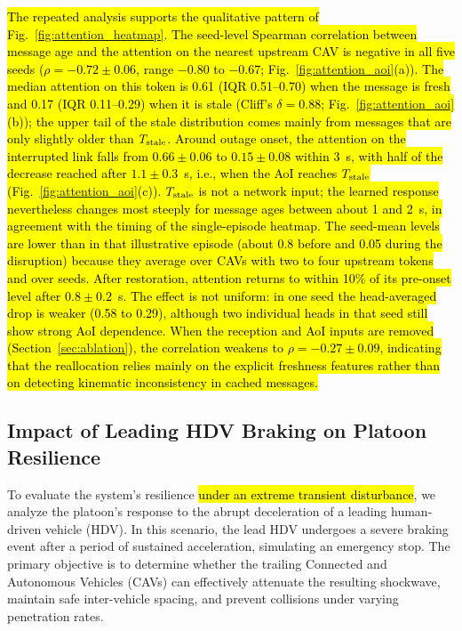 \documentclass{ieeeaccess}
\begin{document}
\hl{The repeated analysis supports the qualitative pattern of Fig.~\ref{fig:attention_heatmap}. The seed-level Spearman correlation between message age and the attention on the nearest upstream CAV is negative in all five seeds ($\rho=-0.72\pm0.06$, range $-0.80$ to $-0.67$; Fig.~\ref{fig:attention_aoi}(a)). The median attention on this token is 0.61 (IQR 0.51--0.70) when the message is fresh and 0.17 (IQR 0.11--0.29) when it is stale (Cliff's $\delta=0.88$; Fig.~\ref{fig:attention_aoi}(b)); the upper tail of the stale distribution comes mainly from messages that are only slightly older than $T_{\rm stale}$. Around outage onset, the attention on the interrupted link falls from $0.66\pm0.06$ to $0.15\pm0.08$ within 3~s, with half of the decrease reached after $1.1\pm0.3$~s, i.e., when the AoI reaches $T_{\rm stale}$ (Fig.~\ref{fig:attention_aoi}(c)). $T_{\rm stale}$ is not a network input; the learned response nevertheless changes most steeply for message ages between about 1 and 2~s, in agreement with the timing of the single-episode heatmap. The seed-mean levels are lower than in that illustrative episode (about 0.8 before and 0.05 during the disruption) because they average over CAVs with two to four upstream tokens and over seeds. After restoration, attention returns to within 10\% of its pre-onset level after $0.8\pm0.2$~s. The effect is not uniform: in one seed the head-averaged drop is weaker (0.58 to 0.29), although two individual heads in that seed still show strong AoI dependence. When the reception and AoI inputs are removed (Section~\ref{sec:ablation}), the correlation weakens to $\rho=-0.27\pm0.09$, indicating that the reallocation relies mainly on the explicit freshness features rather than on detecting kinematic inconsistency in cached messages.} %

\subsection{Impact of Leading HDV Braking on Platoon Resilience}
\label{sec:braking_effects}

To evaluate the system's resilience \hl{under an extreme transient disturbance}, we analyze the platoon's response to the abrupt deceleration of a leading human-driven vehicle (HDV). In this scenario, the lead HDV undergoes a severe braking event after a period of sustained acceleration, simulating an emergency stop. The primary objective is to determine whether the trailing Connected and Autonomous Vehicles (CAVs) can effectively attenuate the resulting shockwave, maintain safe inter-vehicle spacing, and prevent collisions under varying penetration rates.
\end{document}
